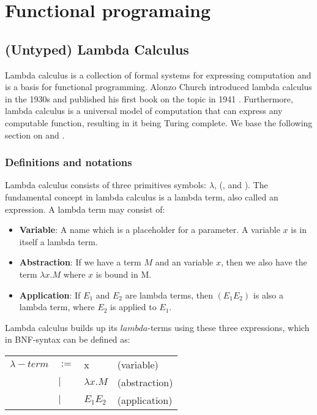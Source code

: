 \section{Functional programaing}

\subsection{(Untyped) Lambda Calculus}
\label{Lambda Calculus}
Lambda calculus is a collection of formal systems for expressing computation and is a basis for functional programming. Alonzo Church introduced lambda calculus in the 1930s and published his first book on the topic in 1941 \autocite{ChurchAlonzo1985Tcol}. Furthermore, lambda calculus is a universal model of computation that can express any computable function, resulting in it being Turing complete. We base the following section on \autocite{RojasRaulLC} and \autocite{nederpelt_geuvers_lc}. 

\subsubsection{Definitions and notations}
Lambda calculus consists of three primitives symbols: $\lambda$, (, and ). The fundamental concept in lambda calculus is a lambda term, also called an expression. A lambda term may consist of: 

\begin{itemize}
    \item \textbf{Variable}: A name which  is a placeholder for a parameter. A variable $x$ is in itself a lambda term.
    \item \textbf{Abstraction}: If we have a term $M$ and an variable $x$, then we also have the term $\lambda x.M$ where $x$ is bound in M. 
    \item \textbf{Application}: If $E_1$ and $E_2$ are lambda terms, then $(E_1 E_2) $ is also a lambda term, where $E_2$ is applied to $E_1$. 
\end{itemize}
Lambda calculus builds up its $lambda$-terms using these three expressions, which in BNF-syntax can be defined as:

\begin{table}[H]
    \centering
    \begin{tabular}{l l l l}
         $\lambda -term$ & $:= $& x  & (variable) \\
         & $|$ & $\lambda x.M$ &(abstraction) \\
         & $|$ & $E_1 E_2$ & (application) \\
    \end{tabular}
\end{table}

